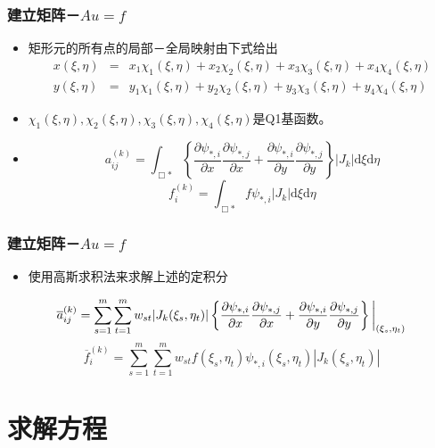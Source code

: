 \documentclass[notheorems,mathserif,table,compress]{beamer}  %
\begin{document}
%
\begin{frame}
\frametitle{建立矩阵－$Au=f$}
\begin{itemize}
\item 矩形元的所有点的局部－全局映射由下式给出
\begin{eqnarray*}
x(\xi,\eta)&=&x_1\chi_1(\xi,\eta)+x_2\chi_2(\xi,\eta)+x_3\chi_3(\xi,\eta)+x_4\chi_4(\xi,\eta)\\
y(\xi,\eta)&=&y_1\chi_1(\xi,\eta)+y_2\chi_2(\xi,\eta)+y_3\chi_3(\xi,\eta)+y_4\chi_4(\xi,\eta)
\end{eqnarray*}
\item $\chi_1(\xi,\eta),\chi_2(\xi,\eta),\chi_3(\xi,\eta),\chi_4(\xi,\eta)$是Q1基函数。
\item 
\newcommand{\ud}{\mathrm{d}}
\begin{displaymath}
a_{ij}^{(k)}=\int_{\Box\ast}\left\{\frac{\partial\psi_{\ast,i}}{\partial x}\frac{\partial\psi_{\ast,j}}{\partial x}+\frac{\partial\psi_{\ast,i}}{\partial y}\frac{\partial\psi_{\ast,j}}{\partial y}\right\}|J_k|\ud\xi \ud\eta
\end{displaymath}
\begin{displaymath}
f_i^{(k)}=\int_{\Box\ast}f\psi_{\ast,i}|J_k|\ud\xi \ud\eta
\end{displaymath}

\end{itemize}
\end{frame}

%
\begin{frame}
\frametitle{建立矩阵－$Au=f$}
\begin{itemize}
\item 使用高斯求积法来求解上述的定积分
\end{itemize}
\begin{displaymath}
\overline a_{ij}^{(k)}=\sum_{s=1}^m\sum_{t=1}^mw_{st}|J_k(\xi_s,\eta_t)|\left\{\frac{\partial\psi_{\ast,i}}{\partial x}\frac{\partial\psi_{\ast,j}}{\partial x}+\frac{\partial\psi_{\ast,i}}{\partial y}\frac{\partial\psi_{\ast,j}}{\partial y}\right\}\bigg{|}_{(\xi_s,\eta_t)}
\end{displaymath}
\begin{displaymath}
\overline f_i^{(k)}=\sum_{s=1}^m\sum_{t=1}^mw_{st}f(\xi_{s},\eta_t)\psi_{\ast,i}(\xi_{s},\eta_t)|J_k(\xi_{s},\eta_t)|
\end{displaymath}
\end{frame}

\section{求解方程}
\end{document}
